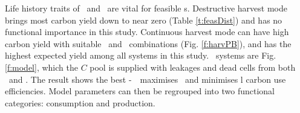 \documentclass[../thesis.tex]{subfiles} %
\begin{document}

Life history traits of \phy\ and \bac\ are vital for feasible \pbs s.  Destructive harvest mode brings most carbon yield down to near zero (Table \ref{t:feasDist}) and has no functional importance in this study.  Continuous harvest mode can have high carbon yield with suitable \phy\ and \bac\ combinations (Fig. \ref{f:harvPB}), and has the highest expected yield among all systems in this study.  \PBH\ systems are Fig. \ref{f:model}, which the $C$ pool is supplied with leakages and dead cells from both \phy\ and \bac.  The result shows the best \phy-\bac\ \pbs\ maximises \phy\ and minimises \bac l carbon use efficiencies.  Model parameters can then be regrouped into two functional categories: consumption and production.
\end{document}
